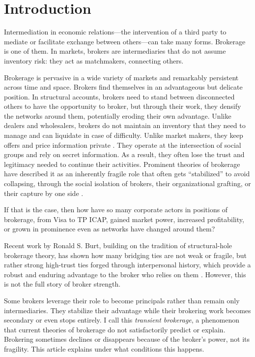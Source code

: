 \documentclass[
]{article}
\begin{document}
\section{Introduction}

Intermediation in economic relations---the intervention of a third party to mediate or facilitate exchange between others---can take many forms. Brokerage is one of them. In markets, brokers are intermediaries that do not assume inventory risk: they act as matchmakers, connecting others.

Brokerage is pervasive in a wide variety of markets and remarkably persistent across time and space. Brokers find themselves in an advantageous but delicate position. In structural accounts, brokers need to stand between disconnected others to have the opportunity to broker, but through their work, they densify the networks around them, potentially eroding their own advantage. Unlike dealers and wholesalers, brokers do not maintain an inventory that they need to manage and can liquidate in case of difficulty. Unlike market makers, they keep offers and price information private \autocite{rustMiddlemenMarketMakers2003}. They operate at the intersection of social groups \autocite{burtStructuralHolesSocial1992,burtStructuralHolesGood2004} and rely on secret information. As a result, they often lose the trust and legitimacy needed to continue their activities. Prominent theories of brokerage have described it as an inherently fragile role that often gets ``stabilized'' to avoid collapsing, through the social isolation of brokers, their organizational grafting, or their capture by one side \autocite{stovelStabilizingBrokerage2011}.

If that is the case, then how have so many corporate actors in positions of brokerage, from Visa to TP ICAP, gained market power, increased profitability, or grown in prominence even as networks have changed around them?

Recent work by Ronald S. Burt, building on the tradition of structural-hole brokerage theory, has shown how many bridging ties are not weak or fragile, but rather strong high-trust ties forged through interpersonal history, which provide a robust and enduring advantage to the broker who relies on them \autocite{burtFragileBrokerage,burtStrongBridgesTrust2026a}. However, this is not the full story of broker strength.

Some brokers leverage their role to become principals rather than remain only intermediaries. They stabilize their advantage while their brokering work becomes secondary or even stops entirely. I call this \emph{transient brokerage}, a phenomenon that current theories of brokerage do not satisfactorily predict or explain. Brokering sometimes declines or disappears because of the broker's power, not its fragility. This article explains under what conditions this happens.
\end{document}
